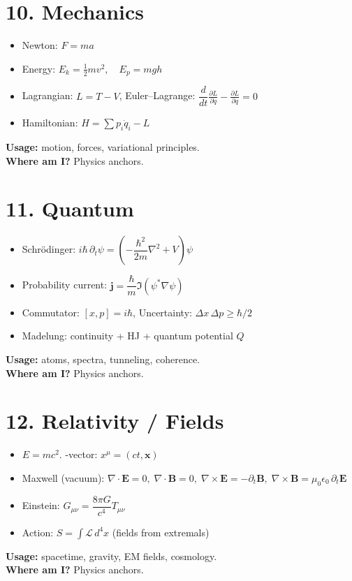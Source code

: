 \documentclass[12pt]{article}
\newcommand{\usage}[1]{\textbf{Usage:} #1}
\newcommand{\where}[1]{\textbf{Where am I?} #1}
\begin{document}
\newpage
\section*{10. Mechanics}
\begin{itemize}
  \item Newton: \(F = m a\)
  \item Energy: \(E_k=\tfrac{1}{2}mv^2,\quad E_p=mgh\)
  \item Lagrangian: \(L=T-V\), \; Euler–Lagrange: \(\dfrac{d}{dt}\frac{\partial L}{\partial \dot q}-\frac{\partial L}{\partial q}=0\)
  \item Hamiltonian: \(H = \sum p_i \dot q_i - L\)
\end{itemize}
\usage{motion, forces, variational principles.}\\
\where{Physics anchors.}

\newpage
\section*{11. Quantum}
\begin{itemize}
  \item Schrödinger: \(i\hbar\,\partial_t \psi = \left(-\dfrac{\hbar^2}{2m}\nabla^2+V\right)\psi\)
  \item Probability current: \(\mathbf j=\dfrac{\hbar}{m}\Im(\psi^*\nabla\psi)\)
  \item Commutator: \([x,p]=i\hbar\), \; Uncertainty: \(\Delta x\,\Delta p \ge \hbar/2\)
  \item Madelung: continuity + HJ + quantum potential \(Q\)
\end{itemize}
\usage{atoms, spectra, tunneling, coherence.}\\
\where{Physics anchors.}

\newpage
\section*{12. Relativity / Fields}
\begin{itemize}
  \item \(E=mc^2\). -vector: \(x^\mu=(ct,\mathbf x)\)
  \item Maxwell (vacuum): \(\nabla\cdot\mathbf E=0,\;\nabla\cdot\mathbf B=0,\;\nabla\times\mathbf E=-\partial_t\mathbf B,\;\nabla\times\mathbf B=\mu_0\epsilon_0\,\partial_t\mathbf E\)
  \item Einstein: \(G_{\mu\nu}=\dfrac{8\pi G}{c^4}T_{\mu\nu}\)
  \item Action: \(S=\int \mathcal L\, d^4x\) \; (fields from extremals)
\end{itemize}
\usage{spacetime, gravity, EM fields, cosmology.}\\
\where{Physics anchors.}
\end{document}
